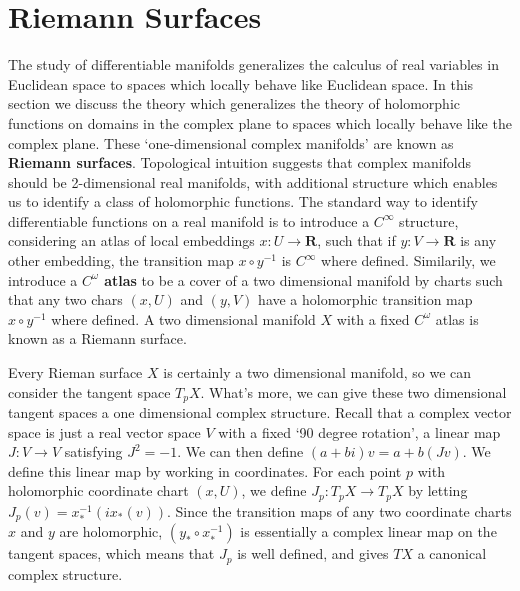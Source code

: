 \chapter{Riemann Surfaces}

The study of differentiable manifolds generalizes the calculus of real variables in Euclidean space to spaces which locally behave like Euclidean space. In this section we discuss the theory which generalizes the theory of holomorphic functions on domains in the complex plane to spaces which locally behave like the complex plane. These `one-dimensional complex manifolds' are known as {\bf Riemann surfaces}. Topological intuition suggests that complex manifolds should be 2-dimensional real manifolds, with additional structure which enables us to identify a class of holomorphic functions. The standard way to identify differentiable functions on a real manifold is to introduce a $C^\infty$ structure, considering an atlas of local embeddings $x: U \to \mathbf{R}$, such that if $y: V \to \mathbf{R}$ is any other embedding, the transition map $x \circ y^{-1}$ is $C^\infty$ where defined. Similarily, we introduce a {\bf $C^\omega$ atlas} to be a cover of a two dimensional manifold by charts such that any two chars $(x,U)$ and $(y,V)$ have a holomorphic transition map $x \circ y^{-1}$ where defined. A two dimensional manifold $X$ with a fixed $C^\omega$ atlas is known as a Riemann surface.

Every Rieman surface $X$ is certainly a two dimensional manifold, so we can consider the tangent space $T_p X$. What's more, we can give these two dimensional tangent spaces a one dimensional complex structure. Recall that a complex vector space is just a real vector space $V$ with a fixed `90 degree rotation', a linear map $J: V \to V$ satisfying $J^2 = -1$. We can then define $(a + bi)v = a + b(Jv)$. We define this linear map by working in coordinates. For each point $p$ with holomorphic coordinate chart $(x,U)$, we define $J_p: T_p X \to T_p X$ by letting $J_p(v) = x_*^{-1}(ix_*(v))$. Since the transition maps of any two coordinate charts $x$ and $y$ are holomorphic, $(y_* \circ x_*^{-1})$ is essentially a complex linear map on the tangent spaces, which means that $J_p$ is well defined, and gives $TX$ a canonical complex structure.

